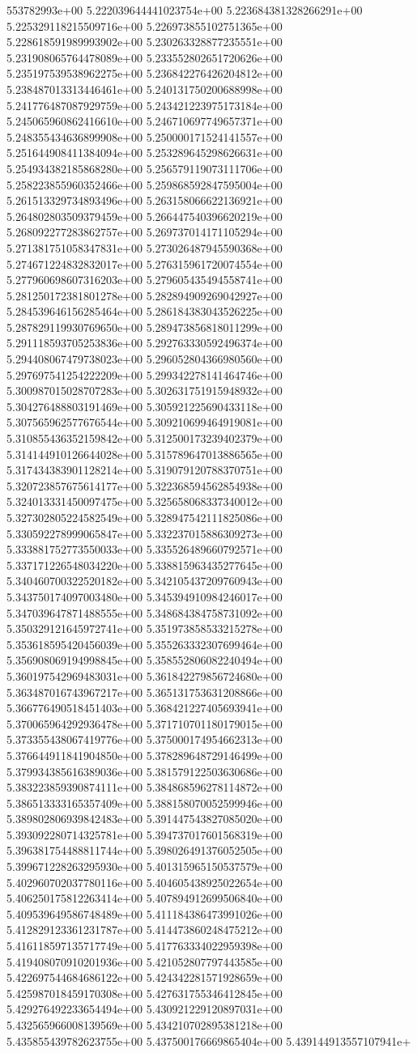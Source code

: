 553782993e+00	5.222039644441023754e+00	5.223684381328266291e+00	5.225329118215509716e+00	5.226973855102751365e+00	5.228618591989993902e+00	5.230263328877235551e+00	5.231908065764478089e+00	5.233552802651720626e+00	5.235197539538962275e+00	5.236842276426204812e+00	5.238487013313446461e+00	5.240131750200688998e+00	5.241776487087929759e+00	5.243421223975173184e+00	5.245065960862416610e+00	5.246710697749657371e+00	5.248355434636899908e+00	5.250000171524141557e+00	5.251644908411384094e+00	5.253289645298626631e+00	5.254934382185868280e+00	5.256579119073111706e+00	5.258223855960352466e+00	5.259868592847595004e+00	5.261513329734893496e+00	5.263158066622136921e+00	5.264802803509379459e+00	5.266447540396620219e+00	5.268092277283862757e+00	5.269737014171105294e+00	5.271381751058347831e+00	5.273026487945590368e+00	5.274671224832832017e+00	5.276315961720074554e+00	5.277960698607316203e+00	5.279605435494558741e+00	5.281250172381801278e+00	5.282894909269042927e+00	5.284539646156285464e+00	5.286184383043526225e+00	5.287829119930769650e+00	5.289473856818011299e+00	5.291118593705253836e+00	5.292763330592496374e+00	5.294408067479738023e+00	5.296052804366980560e+00	5.297697541254222209e+00	5.299342278141464746e+00	5.300987015028707283e+00	5.302631751915948932e+00	5.304276488803191469e+00	5.305921225690433118e+00	5.307565962577676544e+00	5.309210699464919081e+00	5.310855436352159842e+00	5.312500173239402379e+00	5.314144910126644028e+00	5.315789647013886565e+00	5.317434383901128214e+00	5.319079120788370751e+00	5.320723857675614177e+00	5.322368594562854938e+00	5.324013331450097475e+00	5.325658068337340012e+00	5.327302805224582549e+00	5.328947542111825086e+00	5.330592278999065847e+00	5.332237015886309273e+00	5.333881752773550033e+00	5.335526489660792571e+00	5.337171226548034220e+00	5.338815963435277645e+00	5.340460700322520182e+00	5.342105437209760943e+00	5.343750174097003480e+00	5.345394910984246017e+00	5.347039647871488555e+00	5.348684384758731092e+00	5.350329121645972741e+00	5.351973858533215278e+00	5.353618595420456039e+00	5.355263332307699464e+00	5.356908069194998845e+00	5.358552806082240494e+00	5.360197542969483031e+00	5.361842279856724680e+00	5.363487016743967217e+00	5.365131753631208866e+00	5.366776490518451403e+00	5.368421227405693941e+00	5.370065964292936478e+00	5.371710701180179015e+00	5.373355438067419776e+00	5.375000174954662313e+00	5.376644911841904850e+00	5.378289648729146499e+00	5.379934385616389036e+00	5.381579122503630686e+00	5.383223859390874111e+00	5.384868596278114872e+00	5.386513333165357409e+00	5.388158070052599946e+00	5.389802806939842483e+00	5.391447543827085020e+00	5.393092280714325781e+00	5.394737017601568319e+00	5.396381754488811744e+00	5.398026491376052505e+00	5.399671228263295930e+00	5.401315965150537579e+00	5.402960702037780116e+00	5.404605438925022654e+00	5.406250175812263414e+00	5.407894912699506840e+00	5.409539649586748489e+00	5.411184386473991026e+00	5.412829123361231787e+00	5.414473860248475212e+00	5.416118597135717749e+00	5.417763334022959398e+00	5.419408070910201936e+00	5.421052807797443585e+00	5.422697544684686122e+00	5.424342281571928659e+00	5.425987018459170308e+00	5.427631755346412845e+00	5.429276492233654494e+00	5.430921229120897031e+00	5.432565966008139569e+00	5.434210702895381218e+00	5.435855439782623755e+00	5.437500176669865404e+00	5.439144913557107941e+
